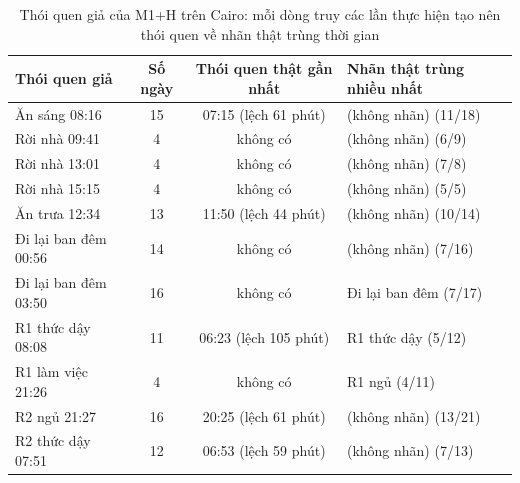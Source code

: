 \begin{table}[htbp]
\centering
\caption{Thói quen giả của M1+H trên Cairo: mỗi dòng truy các lần thực hiện tạo nên thói quen về nhãn thật trùng thời gian}
\label{tab:false-cairo}
\small
\begin{tabular}{lccl}
\toprule
Thói quen giả & Số ngày & Thói quen thật gần nhất & Nhãn thật trùng nhiều nhất \\
\midrule
Ăn sáng 08:16 & 15 & 07:15 (lệch 61 phút) & (không nhãn) (11/18) \\
Rời nhà 09:41 & 4 & không có & (không nhãn) (6/9) \\
Rời nhà 13:01 & 4 & không có & (không nhãn) (7/8) \\
Rời nhà 15:15 & 4 & không có & (không nhãn) (5/5) \\
Ăn trưa 12:34 & 13 & 11:50 (lệch 44 phút) & (không nhãn) (10/14) \\
Đi lại ban đêm 00:56 & 14 & không có & (không nhãn) (7/16) \\
Đi lại ban đêm 03:50 & 16 & không có & Đi lại ban đêm (7/17) \\
R1 thức dậy 08:08 & 11 & 06:23 (lệch 105 phút) & R1 thức dậy (5/12) \\
R1 làm việc 21:26 & 4 & không có & R1 ngủ (4/11) \\
R2 ngủ 21:27 & 16 & 20:25 (lệch 61 phút) & (không nhãn) (13/21) \\
R2 thức dậy 07:51 & 12 & 06:53 (lệch 59 phút) & (không nhãn) (7/13) \\
\bottomrule
\end{tabular}
\end{table}
